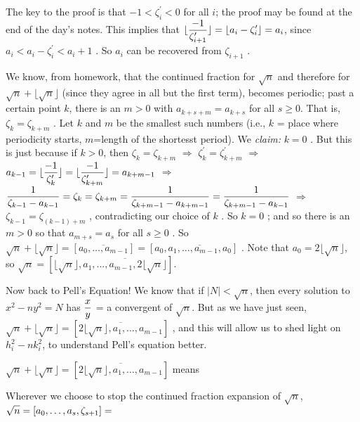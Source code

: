 The key to the proof is that $-1< \zeta_i^\prime  <0$ for all $i$; the proof may be found
at the end of the day's notes. This implies that
$\displaystyle \lfloor{{-1}\over{\zeta_{i+1}^\prime}}\rfloor = \lfloor a_i-\zeta_i^\prime\rfloor = a_i$, since
$a_i<a_i-\zeta_i^\prime < a_i+1$ . So $a_i$ can be recovered from $\zeta_{i+1}$ .

\ssk

We know, from homework, that the continued fraction for $\sqrt{n}$ and therefore 
for $\sqrt{n}+\lfloor\sqrt{n}\rfloor$ (since they agree in all but the first term), becomes
periodic; past a certain point $k$, there is an $m> 0$ with $a_{k+s+m} = a_{k+s}$ for all $s\geq 0$.
That is, $\zeta_k = \zeta_{k+m}$ .
Let $k$ and $m$ be the smallest such numbers (i.e., $k$ = place where periodicity starts, 
$m$=length of the shortesst period). We {\it claim:} $k=0$ . But this is just because if $k>0$, then
$\zeta_k = \zeta_{k+m}$ $\Rightarrow$ $\zeta_k^\prime = \zeta_{k+m}^\prime$ $\Rightarrow$
$\displaystyle a_{k-1} = \lfloor{{-1}\over{\zeta_{k}^\prime}}\rfloor = 
\lfloor{{-1}\over{\zeta_{k+m}^\prime}}\rfloor = a_{k+m-1}$ $\Rightarrow$
$\displaystyle {{1}\over{\zeta_{k-1}-a_{k-1}}} = \zeta_k =  \zeta_{k+m} = {{1}\over{\zeta_{k+m-1}-a_{k+m-1}}}
= {{1}\over{\zeta_{k+m-1}-a_{k-1}}}$ $\Rightarrow$ $\zeta_{k-1} = \zeta_{(k-1)+m}$ , contradicting
our choice of $k$ . 
\hhsk
So $k=0$ ; and so there is an $m>0$ so that $a_{m+s} = a_s$ for all $s\geq 0$ . So
$\sqrt{n}+\lfloor\sqrt{n}\rfloor = [\overline{a_0,\ldots,a_{m-1}}] = [a_0,\overline{a_1,\ldots,a_{m-1},a_0}]$ .
Note that $a_0=2\lfloor\sqrt{n}\rfloor$, so 
\hhsk
$\sqrt{n} = [\lfloor\sqrt{n}\rfloor,\overline{a_1,\ldots,a_{m-1},2\lfloor\sqrt{n}\rfloor}]$.

\msk

Now back to Pell's Equation! We know that if $|N|<\sqrt{n}$, then every solution to $x^2-ny^2=N$
has $\displaystyle {{x}\over{y}}$ = a convergent of $\sqrt{n}$. But as we have just seen,
$\sqrt{n}+\lfloor\sqrt{n}\rfloor = [\overline{2\lfloor\sqrt{n}\rfloor,a_1,\ldots,a_{m-1}}]$ , and this 
will allow us to shed light on $h_i^2-nk_i^2$, to understand Pell's equation better.

\ssk

$\sqrt{n}+\lfloor\sqrt{n}\rfloor = [\overline{2\lfloor\sqrt{n}\rfloor,a_1,\ldots,a_{m-1}}]$
means 

\ssk

Wherever we choose to stop the continued fraction expansion of $\sqrt{n}$, 
$\displaystyle \sqrt{n} = [a_0,\ldots,a_s,\zeta_{s+1}] = $


